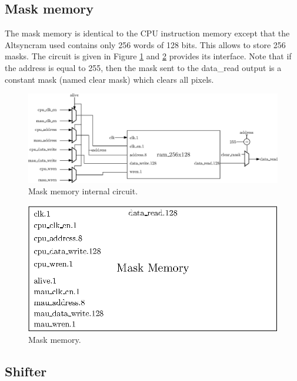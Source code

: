 \subsection{Mask memory}

The mask memory is identical to the CPU instruction memory except that the Altsyncram used contains 
only 256 words of 128 bits. This allows to store 256 masks. The circuit is given in Figure
\ref{fig:gpu/mask_memory_in} and \ref{fig:gpu/mask_memory} provides its interface. Note that if the 
address is equal to 255, then the mask sent to the data\_read output is a constant mask 
(named clear mask) which clears all pixels.

\begin{figure}[H]
    \centering
    \includegraphics[width=\linewidth]{Chapter4-GPU_CLKU/res/mask_memory_in}
    \caption{Mask memory internal circuit.}
    \label{fig:gpu/mask_memory_in}
\end{figure}

\begin{figure}[H]
    \centering
    \includegraphics[scale=0.8]{Chapter4-GPU_CLKU/res/mask_memory}
    \caption{Mask memory.}
    \label{fig:gpu/mask_memory}
\end{figure}

\subsection{Shifter}

